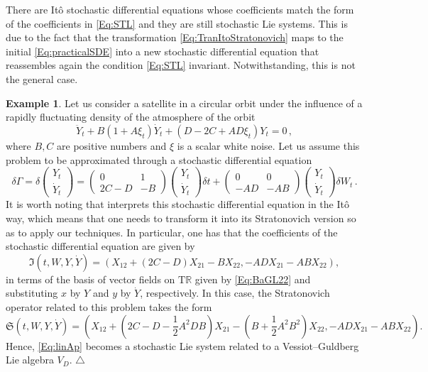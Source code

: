 \documentclass[11pt]{article}
\theoremstyle{plain}
\theoremstyle{definition}
\newcommand\xqed[1]{%
    \leavevmode\unskip\penalty9999 \hbox{}\nobreak\hfill
	\quad\hbox{#1}}
\newcommand\demo{\xqed{$\triangle$}}
\newtheorem{example}[theorem]{Example}
\newcommand{\T}{\mathrm{T}}
\begin{document}
There are  It\^{o} stochastic differential equations whose coefficients match the form of the coefficients in \eqref{Eq:STL} and they are still stochastic Lie systems. This is due to the fact that the transformation \eqref{Eq:TranItoStratonovich} maps to the initial \eqref{Eq:practicalSDE} into a new stochastic differential equation that reassembles again the condition \eqref{Eq:STL} invariant. Notwithstanding, this is not the general case.
\begin{example} Let us consider a satellite in a circular orbit under the influence of a rapidly fluctuating density of the atmosphere of the orbit \cite[Eq. (3.25)]{Sa70}
$$ \ddot Y_t+B(1+A\xi_t)\dot Y_t+(D-2C+AD\xi_t)Y_t=0\,, $$
where $B,C$ are positive numbers and $\xi$ is a scalar white noise. Let us assume this problem to be approximated through a stochastic differential equation \cite[Eq. (3.29)]{Sa70}
\begin{equation}\label{Eq:linAp}
 \delta \Gamma=\delta \begin{pmatrix}
    Y_t\\ \dot Y_t
\end{pmatrix} = \begin{pmatrix}
    0 & 1 \\ 2C-D & -B
\end{pmatrix}\begin{pmatrix}
    Y_t \\ \dot Y_t
\end{pmatrix} \delta t + \begin{pmatrix} 
    0 & 0 \\ -AD & -AB
\end{pmatrix} \begin{pmatrix}
    Y_t\\ \dot Y_t
\end{pmatrix}\delta W_t\,.
\end{equation}
It is worth noting that \cite{Sa70} interprets this stochastic differential equation in the It\^{o} way, which means that one needs to transform it into its Stratonovich version so as to apply our techniques. In particular, one has that the coefficients of the stochastic differential equation are given by
$$
 \mathfrak{I}(t,W,Y,\dot Y)=\left(X_{12}+(2C-D)X_{21}-BX_{22},-ADX_{21}-ABX_{22}\right),
 $$
  in terms of the basis of vector fields on $\T \mathbb{R}$ given by \eqref{Eq:BaGL22} and substituting $x$ by $Y$ and $y$ by $\dot Y$, respectively.
In this case, the Stratonovich operator related to this problem takes the form
 $$
 \mathfrak{S}(t,W,Y,\dot Y)=\left( X_{12}+\left(2C-D-\frac 12A^2 D B\right)X_{21}-\left(B+\frac 12 A^2B^2\right)X_{22},-ADX_{21}-ABX_{22}\right).
 $$
 Hence, \eqref{Eq:linAp} becomes a stochastic Lie system related to a Vessiot--Guldberg Lie algebra $V_D$.  
 \demo
 \end{example}
\end{document}
